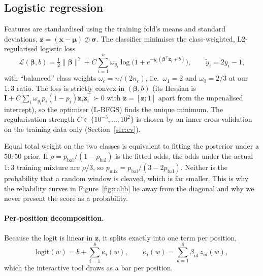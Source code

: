 \subsection{Logistic regression}
\label{sec:lr}
Features are standardised using the training fold's means and standard deviations, $\bm z=(\bm x-\bm\mu)\oslash\bm\sigma$. The classifier minimises the class-weighted, L2-regularised logistic loss
\begin{equation}
\mathcal{L}(\bm\beta,b)=\tfrac12\|\bm\beta\|^2+C\sum_{i=1}^{n}\omega_{y_i}\log\bigl(1+e^{-\tilde y_i(\bm\beta^{\top}\bm z_i+b)}\bigr),\qquad \tilde y_i=2y_i-1,
\label{eq:lr}
\end{equation}
with ``balanced'' class weights $\omega_c=n/(2n_c)$, i.e.\ $\omega_1=2$ and $\omega_0=2/3$ at our $1{:}3$ ratio. The loss is strictly convex in $(\bm\beta,b)$ (its Hessian is $\bm I+C\sum_i\omega_{y_i}p_i(1-p_i)\tilde{\bm z}_i\tilde{\bm z}_i^{\top}\succ0$ with $\tilde{\bm z}=[\bm z;1]$ apart from the unpenalised intercept), so the optimiser (L-BFGS) finds the unique minimum. The regularisation strength $C\in\{10^{-3},\dots,10^{2}\}$ is chosen by an inner cross-validation on the training data only (Section~\ref{sec:cv}).

\begin{derivation}
Equal total weight on the two classes is equivalent to fitting the posterior under a $50{:}50$ prior. If $\rho=p_{\mathrm{bal}}/(1-p_{\mathrm{bal}})$ is the fitted odds, the odds under the actual $1{:}3$ training mixture are $\rho/3$, so $p_{\mathrm{mix}}=p_{\mathrm{bal}}/(3-2p_{\mathrm{bal}})$. Neither is the probability that a random window is cleaved, which is far smaller. This is why the reliability curves in Figure~\ref{fig:calib} lie away from the diagonal and why we never present the score as a probability.
\end{derivation}

\paragraph{Per-position decomposition.} Because the logit is linear in $\bm z$, it splits exactly into one term per position,
\begin{equation}
\mathrm{logit}(w)=b+\sum_{i=1}^{8}\kappa_i(w),\qquad \kappa_i(w)=\sum_{d=1}^{8}\beta_{id}\,z_{id}(w),
\label{eq:decomp}
\end{equation}
which the interactive tool draws as a bar per position.

